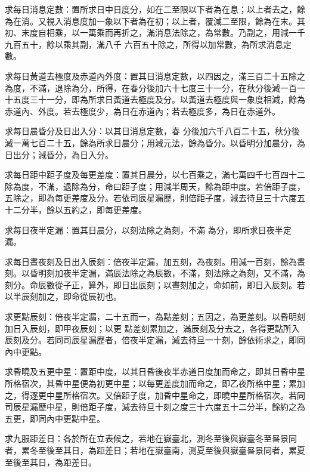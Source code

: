 \begin{pinyinscope}
 求每日消息定數：置所求日中日度分，如在二至限以下者為在息；以上者去之，餘為在消。又視入消息度加一象以下者為在初；以上者，覆減二至限，餘為在末。其初、末度自相乘，以一萬乘而再折之，滿消息法除之，為常數。乃副之，用減一千九百五十，餘以乘其副，滿八千
 六百五十除之，所得以加常數，為所求消息定數。



 求每日黃道去極度及赤道內外度：置其日消息定數，以四因之，滿三百二十五除之為度，不滿，退除為分，所得，在春分後加六十七度三十一分，在秋分後減一百一十五度三十一分，即為所求日黃道去極度及分。以黃道去極度與一象度相減，餘為赤道內、外度。若去極度少，為日在赤道內；若去極度多，為日在赤道外。



 求每日晨昏分及日出入分：以其日消息定數，春
 分後加六千八百二十五，秋分後減一萬七百二十五，餘為所求日晨分；用減元法，餘為昏分。以昏明分加晨分，為日出分；減昏分，為日入分。



 求每日距中距子度及每更差度：置其日晨分，以七百乘之，滿七萬四千七百四十二除為度，不滿，退除為分，命曰距子度；用減半周天，餘為距中度。若倍距子度，五除之，即為每更差度及分。若依司辰星漏歷，則倍距子度，減去待旦三十六度五十二分半，餘以五約之，即每更差度。



 求每日夜半定漏：置其日晨分，以刻法除之為刻，不滿
 為分，即所求日夜半定漏。



 求每日晝夜刻及日出入辰刻：倍夜半定漏，加五刻，為夜刻。用減一百刻，餘為晝刻。以昏明刻加夜半定漏，滿辰法除之為辰數，不滿，刻法除之為刻，又不滿，為刻分。命辰數從子正，算外，即日出辰刻；以晝刻加之，命如前，即日入辰刻。若以半辰刻加之，即命從辰初也。



 求更點辰刻：倍夜半定漏，二十五而一，為點差刻；五因之，為更差刻。以昏明刻加日入辰刻，即甲夜辰刻；以更
 點差刻累加之，滿辰刻及分去之，各得更點所入辰刻及分。若同司辰星漏歷者，倍夜半定漏，減去待旦一十刻，餘依術求之，即同內中更點。



 求昏曉及五更中星：置距中度，以其日昏後夜半赤道日度加而命之，即其日昏中星所格宿次，其昏中星便為初更中星；以每更差度加而命之，即乙夜所格中星；累加之，得逐更中星所格宿次。又倍距子度，加昏中星命之，即曉中星所格宿次。若同司辰星漏歷中星，則倍距子度，減去待旦十刻之度三十六度五十二分半，餘約之為五更，即同內中更點中星。



 求九服距差日：各於所在立表候之，若地在嶽臺北，測冬至後與嶽臺冬至晷景同者，累冬至後至其日，為距差日；若地在嶽臺南，測夏至後與嶽臺晷景同者，累夏至後至其日，為距差日。




\end{pinyinscope}
